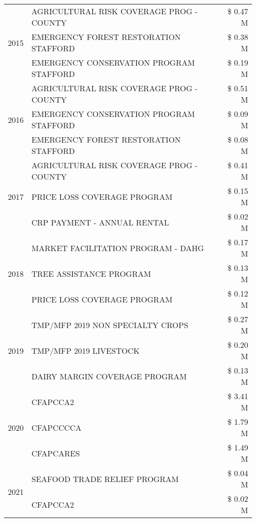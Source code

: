 \begin{tabular}{llr}
\multirow[t]{3}{*}{2015} & AGRICULTURAL RISK COVERAGE PROG - COUNTY & \$ 0.47 M \\
 & EMERGENCY FOREST RESTORATION STAFFORD & \$ 0.38 M \\
 & EMERGENCY CONSERVATION PROGRAM STAFFORD & \$ 0.19 M \\
\cline{1-3}
\multirow[t]{3}{*}{2016} & AGRICULTURAL RISK COVERAGE PROG - COUNTY      & \$ 0.51 M \\
 & EMERGENCY CONSERVATION PROGRAM STAFFORD       & \$ 0.09 M \\
 & EMERGENCY FOREST RESTORATION STAFFORD         & \$ 0.08 M \\
\cline{1-3}
\multirow[t]{3}{*}{2017} & AGRICULTURAL RISK COVERAGE PROG - COUNTY & \$ 0.41 M \\
 & PRICE LOSS COVERAGE PROGRAM & \$ 0.15 M \\
 & CRP PAYMENT - ANNUAL RENTAL & \$ 0.02 M \\
\cline{1-3}
\multirow[t]{3}{*}{2018} & MARKET FACILITATION PROGRAM - DAHG & \$ 0.17 M \\
 & TREE ASSISTANCE PROGRAM & \$ 0.13 M \\
 & PRICE LOSS COVERAGE PROGRAM & \$ 0.12 M \\
\cline{1-3}
\multirow[t]{3}{*}{2019} & TMP/MFP 2019 NON SPECIALTY CROPS & \$ 0.27 M \\
 & TMP/MFP 2019 LIVESTOCK & \$ 0.20 M \\
 & DAIRY MARGIN COVERAGE PROGRAM & \$ 0.13 M \\
\cline{1-3}
\multirow[t]{3}{*}{2020} & CFAPCCA2 & \$ 3.41 M \\
 & CFAPCCCCA & \$ 1.79 M \\
 & CFAPCARES & \$ 1.49 M \\
\cline{1-3}
\multirow[t]{2}{*}{2021} & SEAFOOD TRADE RELIEF PROGRAM & \$ 0.04 M \\
 & CFAPCCA2 & \$ 0.02 M \\
\cline{1-3}
\bottomrule
\end{tabular}
